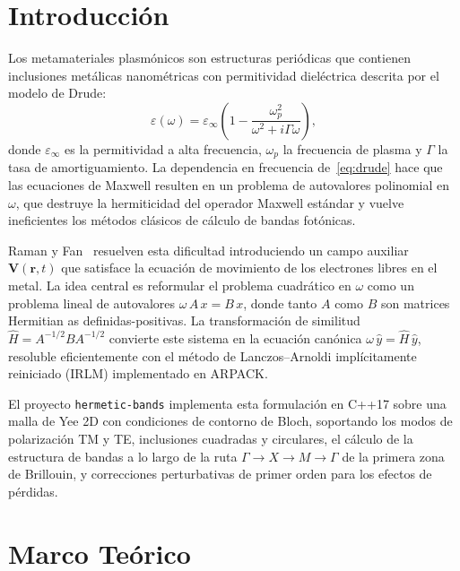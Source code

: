 \documentclass[12pt,a4paper]{article}
\newcommand{\omegap}{\omega_p}
\newcommand{\epsinf}{\varepsilon_\infty}
\newcommand{\vect}[1]{\bm{#1}}
\begin{document}
\tableofcontents
\newpage

\section{Introducción}

Los metamateriales plasmónicos son estructuras periódicas que contienen
inclusiones metálicas nanométricas con permitividad dieléctrica descrita
por el modelo de Drude:
\begin{equation}
  \varepsilon(\omega) = \epsinf\!\left(1 - \frac{\omegap^2}{\omega^2 + i\Gamma\omega}\right),
  \label{eq:drude}
\end{equation}
donde $\epsinf$ es la permitividad a alta frecuencia, $\omegap$ la
frecuencia de plasma y $\Gamma$ la tasa de amortiguamiento.
La dependencia en frecuencia de~\eqref{eq:drude} hace que las ecuaciones
de Maxwell resulten en un problema de autovalores polinomial en $\omega$,
que destruye la hermiticidad del operador Maxwell estándar y vuelve
ineficientes los métodos clásicos de cálculo de bandas fotónicas.

Raman y Fan~\cite{Raman2010} resuelven esta dificultad introduciendo un
campo auxiliar $\vect{V}(\vect{r},t)$ que satisface la ecuación de movimiento
de los electrones libres en el metal.
La idea central es reformular el problema cuadrático en $\omega$ como un
problema lineal de autovalores $\omega\, A\, x = B\, x$, donde tanto $A$
como $B$ son matrices Hermitian as definidas-positivas.
La transformación de similitud $\hat{H} = A^{-1/2} B A^{-1/2}$ convierte
este sistema en la ecuación canónica $\omega\,\hat{y} = \hat{H}\,\hat{y}$,
resoluble eficientemente con el método de Lanczos--Arnoldi
implícitamente reiniciado (IRLM) implementado en ARPACK.

El proyecto \texttt{hermetic-bands} implementa esta formulación en C++17
sobre una malla de Yee 2D con condiciones de contorno de Bloch,
soportando los modos de polarización TM y TE, inclusiones cuadradas y
circulares, el cálculo de la estructura de bandas a lo largo de la ruta
$\Gamma\!\to\! X\!\to\! M\!\to\!\Gamma$ de la primera zona de Brillouin,
y correcciones perturbativas de primer orden para los efectos de pérdidas.

\section{Marco Teórico}
\end{document}
